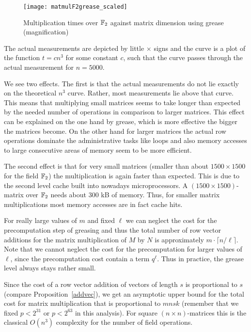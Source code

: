 \begin{figure}[ht]
\begin{center}
\texttt{[image: matmulF2grease\_scaled]}
\end{center}
\caption{Multiplication times over $\mathbb{F}_2$ against matrix dimension
using grease
(magnification)}
\label{matmulgrease_scaled}
\end{figure}

The actual measurements are depicted by little $\times$ signs and
the curve is a plot of the function $t = cn^3$ for some constant $c$, such
that the curve passes through the actual measurement for $n=5000$.

We see two effects. The first is that the actual measurements do not lie
exactly on the theoretical $n^3$ curve. Rather, most measurements lie above
that curve. This means that multiplying small matrices seems to take
longer than expected by the needed number of operations in comparison 
to larger matrices. This effect can be explained on the one hand by grease,
which is more effective the bigger the matrices become. On the other hand
for larger matrices the actual row operations dominate the administrative
tasks like loops and also memory accesses to large consecutive areas of
memory seem to be more efficient.

The second effect is that for very small matrices (smaller than about $1500
\times 1500$ for the field $\mathbb{F}_2$) the multiplication is again faster
than expected. This is due to the second level cache built into nowadays
microprocessors. A $(1500\times 1500)$-matrix over $\mathbb{F}_2$ needs about
$300$ kB of memory. Thus, for smaller matrix multiplications most memory
accesses are in fact cache hits.

For really large values of $m$ and fixed $\ell$ we can neglect the cost for the
precomputation step of greasing and thus the total number of row 
vector additions for the matrix multiplication of $M$ by $N$ is
approximately $m \cdot \lceil n/\ell \rceil$. Note that we cannot
neglect the cost for the precomputation for larger values of $\ell$,
since the precomputation cost contain a term $q^\ell$. Thus in practice,
the grease level always stays rather small.

Since the cost of
a row vector addition of vectors of length $s$ is proportional
to $s$ (compare Proposition~\ref{addvec}), we get an asymptotic upper
bound for the total cost for matrix multiplication that is proportional
to $mnsk$ (remember that we fixed $p < 2^{31}$ or $p< 2^{63}$ in this
analysis). For square $(n \times n)$-matrices this is the classical
$O(n^3)$ complexity for the number of field operations.

